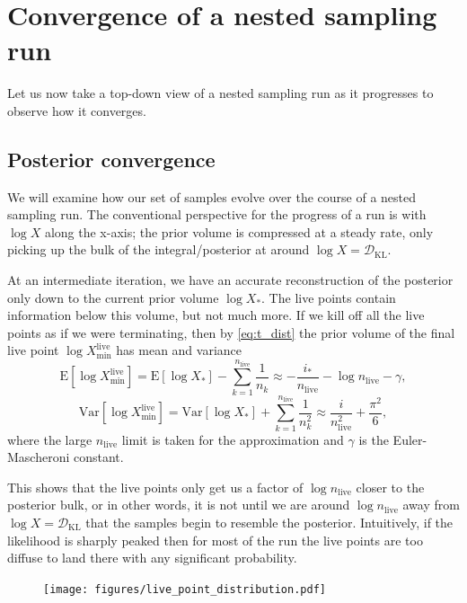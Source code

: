\documentclass[usenatbib]{mnras}
\newcommand{\nlive}{n_\mathrm{live}}
\newcommand{\DKL}{\mathcal{D}_\mathrm{KL}}
\begin{document}
\section{Convergence of a nested sampling run}
Let us now take a top-down view of a nested sampling run as it progresses to observe how it converges. 

\subsection{Posterior convergence}
We will examine how our set of samples evolve over the course of a nested sampling run. The conventional perspective for the progress of a run is with $\log X$ along the x-axis; the prior volume is compressed at a steady rate, only picking up the bulk of the integral/posterior at around $\log X = \DKL$.  
\par
At an intermediate iteration, we have an accurate reconstruction of the posterior only down to the current prior volume $\log X_*$. The live points contain information below this volume, but not much more. If we kill off all the live points as if we were terminating, then by \cref{eq:t_dist} the prior volume of the final live point $\log X_\mathrm{min}^{\mathrm{live}}$ has mean and variance
\begin{equation}
	\mathrm{E}[\log X_\mathrm{min}^{\mathrm{live}}] = \mathrm{E}[\log X_*] - \sum_{k=1}^{\nlive} \frac{1}{n_k} \approx -\frac{i_*}{\nlive} - \log \nlive - \gamma,
\end{equation}
\begin{equation}
	\mathrm{Var}[\log X_\mathrm{min}^{\mathrm{live}}] = \mathrm{Var}[\log X_*] + \sum_{k=1}^{\nlive} \frac{1}{n_k^2} \approx \frac{i}{\nlive^2} + \frac{\pi^2}{6},
\end{equation}
where the large $\nlive$ limit is taken for the approximation and $\gamma$ is the Euler-Mascheroni constant. 
\par
This shows that the live points only get us a factor of $\log \nlive$ closer to the posterior bulk, or in other words, it is not until we are around $\log \nlive$ away from $\log X = \DKL$ that the samples begin to resemble the posterior. Intuitively, if the likelihood is sharply peaked then for most of the run the live points are too diffuse to land there with any significant probability.
\par
\begin{figure}
\begin{center}
	\texttt{[image: figures/live\_point\_distribution.pdf]}
\end{center}
\caption{}
\label{fig:}
\end{figure}
\end{document}
